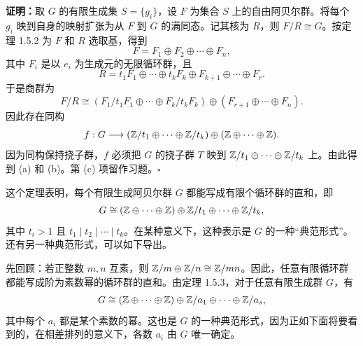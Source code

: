\noindent\textbf{证明：}取 $G$ 的有限生成集 $S=\{g_i\}$，设 $F$ 为集合 $S$ 上的自由阿贝尔群。将每个 $g_i$ 映到自身的映射扩张为从 $F$ 到 $G$ 的满同态。记其核为 $R$，则 $F/R\cong G$。按定理 1.5.2 为 $F$ 和 $R$ 选取基，得到
\[
F=F_1\oplus F_2\oplus\cdots\oplus F_n,
\]
其中 $F_i$ 是以 $e_i$ 为生成元的无限循环群，且
\[
R=t_1F_1\oplus\cdots\oplus t_kF_k\oplus F_{k+1}\oplus\cdots\oplus F_r.
\]
于是商群为
\[
F/R\cong(F_1/t_1F_1\oplus\cdots\oplus F_k/t_kF_k)
\oplus(F_{r+1}\oplus\cdots\oplus F_n).
\]
因此存在同构
\[
f:G\longrightarrow(\mathbb{Z}/t_1\oplus\cdots\oplus\mathbb{Z}/t_k)
\oplus(\mathbb{Z}\oplus\cdots\oplus\mathbb{Z}).
\]
因为同构保持挠子群，$f$ 必须把 $G$ 的挠子群 $T$ 映到 $\mathbb{Z}/t_1\oplus\cdots\oplus\mathbb{Z}/t_k$ 上。由此得到 (a) 和 (b)。第 (c) 项留作习题。\hfill$\square$

这个定理表明，每个有限生成阿贝尔群 $G$ 都能写成有限个循环群的直和，即
\[
G\cong(\mathbb{Z}\oplus\cdots\oplus\mathbb{Z})\oplus\mathbb{Z}/t_1\oplus\cdots\oplus\mathbb{Z}/t_k,
\]
其中 $t_i>1$ 且 $t_1\mid t_2\mid\cdots\mid t_k$。在某种意义下，这种表示是 $G$ 的一种“典范形式”。还有另一种典范形式，可以如下导出。

先回顾：若正整数 $m,n$ 互素，则 $\mathbb{Z}/m\oplus\mathbb{Z}/n\cong\mathbb{Z}/mn$。因此，任意有限循环群都能写成阶为素数幂的循环群的直和。由定理 1.5.3，对于任意有限生成群 $G$，有
\[
G\cong(\mathbb{Z}\oplus\cdots\oplus\mathbb{Z})\oplus\mathbb{Z}/a_1\oplus\cdots\oplus\mathbb{Z}/a_s,
\]
其中每个 $a_i$ 都是某个素数的幂。这也是 $G$ 的一种典范形式，因为正如下面将要看到的，在相差排列的意义下，各数 $a_i$ 由 $G$ 唯一确定。

